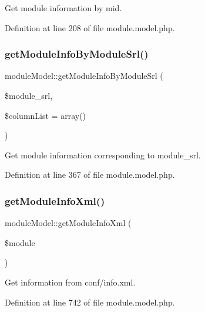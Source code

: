 Get module information by mid. 



Definition at line 208 of file module.\+model.\+php.

\hypertarget{classmoduleModel_aa31240372b98008ff8a2ad689535d3a9}{}\label{classmoduleModel_aa31240372b98008ff8a2ad689535d3a9} 
\subsubsection{\texorpdfstring{get\+Module\+Info\+By\+Module\+Srl()}{getModuleInfoByModuleSrl()}}
{\footnotesize\ttfamily module\+Model\+::get\+Module\+Info\+By\+Module\+Srl (\begin{DoxyParamCaption}\item[{}]{\$module\+\_\+srl,  }\item[{}]{\$column\+List = {\ttfamily array()} }\end{DoxyParamCaption})}



Get module information corresponding to module\+\_\+srl. 



Definition at line 367 of file module.\+model.\+php.

\hypertarget{classmoduleModel_ae4e9287674bddc605dfc4cef77f8c1bb}{}\label{classmoduleModel_ae4e9287674bddc605dfc4cef77f8c1bb} 
\subsubsection{\texorpdfstring{get\+Module\+Info\+Xml()}{getModuleInfoXml()}}
{\footnotesize\ttfamily module\+Model\+::get\+Module\+Info\+Xml (\begin{DoxyParamCaption}\item[{}]{\$module }\end{DoxyParamCaption})}



Get information from conf/info.\+xml. 



Definition at line 742 of file module.\+model.\+php.

\hypertarget{classmoduleModel_af51708f2ce0243f482bc92a453dd27c4}{}\label{classmoduleModel_af51708f2ce0243f482bc92a453dd27c4} 
